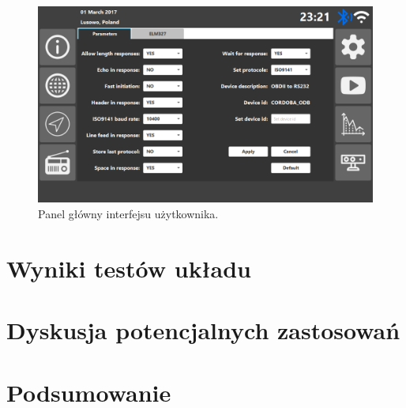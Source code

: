 \documentclass[12pt]{article} %
\numberwithin{equation}{subsection}
\numberwithin{figure}{section}
\numberwithin{table}{section}
\begin{document}
		\newpage
		
		\begin{figure}[!h]
			\centering
			\includegraphics[scale=0.5]{Images/user_interface_settings_parameters_tab.png}
			\caption{Panel główny interfejsu użytkownika.}
			\label{user_interface_dashboard}
		\end{figure}
	
	
	\newpage
	
	\section{Wyniki testów układu}	
	
	\newpage
	
	\section{Dyskusja potencjalnych zastosowań}
	
	\newpage
	
	\section{Podsumowanie}
	
	\hspace{0.5cm} 
	
	\newpage	
	
\end{document}
